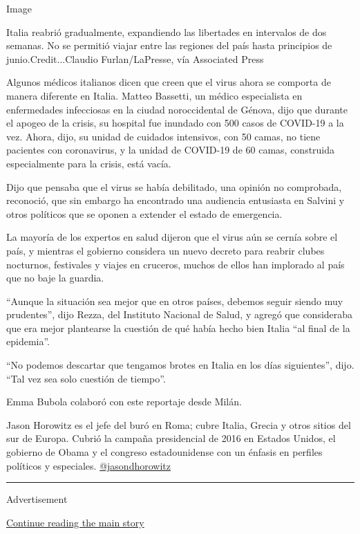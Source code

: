 Image

Italia reabrió gradualmente, expandiendo las libertades en intervalos de
dos semanas. No se permitió viajar entre las regiones del país hasta
principios de junio.Credit...Claudio Furlan/LaPresse, vía Associated
Press

Algunos médicos italianos dicen que creen que el virus ahora se comporta
de manera diferente en Italia. Matteo Bassetti, un médico especialista
en enfermedades infecciosas en la ciudad noroccidental de Génova, dijo
que durante el apogeo de la crisis, su hospital fue inundado con 500
casos de COVID-19 a la vez. Ahora, dijo, su unidad de cuidados
intensivos, con 50 camas, no tiene pacientes con coronavirus, y la
unidad de COVID-19 de 60 camas, construida especialmente para la crisis,
está vacía.

Dijo que pensaba que el virus se había debilitado, una opinión no
comprobada, reconoció, que sin embargo ha encontrado una audiencia
entusiasta en Salvini y otros políticos que se oponen a extender el
estado de emergencia.

La mayoría de los expertos en salud dijeron que el virus aún se cernía
sobre el país, y mientras el gobierno considera un nuevo decreto para
reabrir clubes nocturnos, festivales y viajes en cruceros, muchos de
ellos han implorado al país que no baje la guardia.

``Aunque la situación sea mejor que en otros países, debemos seguir
siendo muy prudentes'', dijo Rezza, del Instituto Nacional de Salud, y
agregó que consideraba que era mejor plantearse la cuestión de qué había
hecho bien Italia ``al final de la epidemia''.

``No podemos descartar que tengamos brotes en Italia en los días
siguientes'', dijo. ``Tal vez sea solo cuestión de tiempo''.

Emma Bubola colaboró con este reportaje desde Milán.

Jason Horowitz es el jefe del buró en Roma; cubre Italia, Grecia y otros
sitios del sur de Europa. Cubrió la campaña presidencial de 2016 en
Estados Unidos, el gobierno de Obama y el congreso estadounidense con un
énfasis en perfiles políticos y especiales.
\href{https://twitter.com/jasondhorowitz}{@jasondhorowitz}

\begin{center}\rule{0.5\linewidth}{\linethickness}\end{center}

Advertisement

\protect\hyperlink{after-bottom}{Continue reading the main story}

